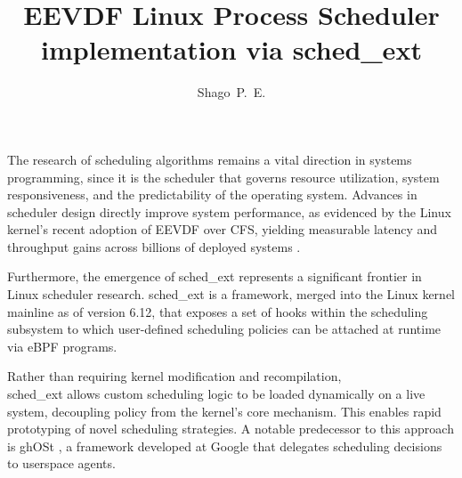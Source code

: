 \documentclass[a4paper]{article}
\begin{document}



\author{Shago~P.~E.}

\title{EEVDF Linux Process Scheduler implementation via sched\_ext}

\renewcommand{\thefootnote}{ }
{}

\maketitle






The research of scheduling algorithms remains a vital direction in
systems programming, since it is the scheduler that governs resource
utilization, system responsiveness, and the predictability of the operating system.
Advances in scheduler design directly improve system performance,
as evidenced by the Linux kernel's recent adoption of EEVDF over CFS,
yielding measurable latency and throughput gains across
billions of deployed systems \cite{EEVDF_intro}.

Furthermore, the emergence of sched\_ext represents a significant frontier
in Linux scheduler research. sched\_ext \cite{sched_ext_intro}
is a framework, merged into the
Linux kernel mainline as of version 6.12, that exposes a set of hooks within
the scheduling subsystem to which user-defined scheduling policies
can be attached at runtime via eBPF programs.

Rather than requiring kernel modification and recompilation,\\
sched\_ext allows custom scheduling logic to be loaded dynamically on a live system,
decoupling policy from the kernel's core mechanism.
This enables rapid prototyping of novel scheduling strategies.
A notable predecessor to this approach is ghOSt \cite{ghOSt}, a framework
developed at Google that delegates scheduling decisions to userspace agents.
\end{document}
